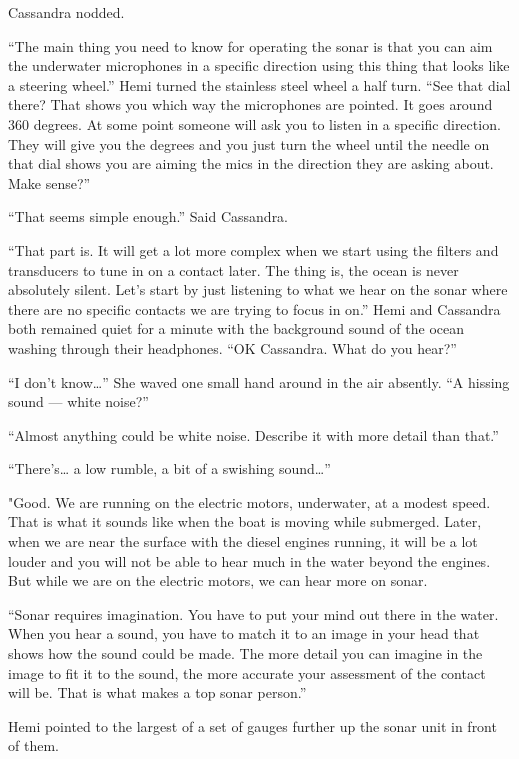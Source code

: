\documentclass[]{scrbook}
\begin{document}
Cassandra nodded.

``The main thing you need to know for operating the sonar is that you
can aim the underwater microphones in a specific direction using this
thing that looks like a steering wheel.'' Hemi turned the stainless
steel wheel a half turn. ``See that dial there? That shows you which way
the microphones are pointed. It goes around 360 degrees. At some point
someone will ask you to listen in a specific direction. They will give
you the degrees and you just turn the wheel until the needle on that
dial shows you are aiming the mics in the direction they are asking
about. Make sense?''

``That seems simple enough.'' Said Cassandra.

``That part is. It will get a lot more complex when we start using the
filters and transducers to tune in on a contact later. The thing is, the
ocean is never absolutely silent. Let's start by just listening to what
we hear on the sonar where there are no specific contacts we are trying
to focus in on.'' Hemi and Cassandra both remained quiet for a minute
with the background sound of the ocean washing through their headphones.
``OK Cassandra. What do you hear?''

``I don't know\ldots{}'' She waved one small hand around in the air
absently. ``A hissing sound --- white noise?''

``Almost anything could be white noise. Describe it with more detail
than that.''

``There's\ldots{} a low rumble, a bit of a swishing sound\ldots{}''

"Good. We are running on the electric motors, underwater, at a modest
speed. That is what it sounds like when the boat is moving while
submerged. Later, when we are near the surface with the diesel engines
running, it will be a lot louder and you will not be able to hear much
in the water beyond the engines. But while we are on the electric
motors, we can hear more on sonar.

``Sonar requires imagination. You have to put your mind out there in the
water. When you hear a sound, you have to match it to an image in your
head that shows how the sound could be made. The more detail you can
imagine in the image to fit it to the sound, the more accurate your
assessment of the contact will be. That is what makes a top sonar
person.''

Hemi pointed to the largest of a set of gauges further up the sonar unit
in front of them.
\end{document}
